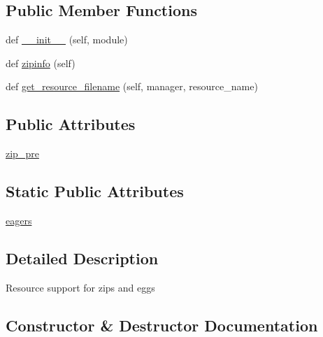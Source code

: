 \subsection*{Public Member Functions}
\begin{DoxyCompactItemize}
\item 
def \hyperlink{classpip_1_1__vendor_1_1pkg__resources_1_1ZipProvider_a6a6971955af1c89e8917f89b4f856101}{\+\_\+\+\_\+init\+\_\+\+\_\+} (self, module)
\item 
def \hyperlink{classpip_1_1__vendor_1_1pkg__resources_1_1ZipProvider_aa18eec9f792616d5ff701a41b3446585}{zipinfo} (self)
\item 
def \hyperlink{classpip_1_1__vendor_1_1pkg__resources_1_1ZipProvider_a86f81d4504722cafa68dad0f29058450}{get\+\_\+resource\+\_\+filename} (self, manager, resource\+\_\+name)
\end{DoxyCompactItemize}
\subsection*{Public Attributes}
\begin{DoxyCompactItemize}
\item 
\hyperlink{classpip_1_1__vendor_1_1pkg__resources_1_1ZipProvider_a8e41d56c67ec5435c776bc35af5d436b}{zip\+\_\+pre}
\end{DoxyCompactItemize}
\subsection*{Static Public Attributes}
\begin{DoxyCompactItemize}
\item 
\hyperlink{classpip_1_1__vendor_1_1pkg__resources_1_1ZipProvider_a64963e2866da1d9615a2c92277501970}{eagers}
\end{DoxyCompactItemize}


\subsection{Detailed Description}
\begin{DoxyVerb}Resource support for zips and eggs\end{DoxyVerb}
 

\subsection{Constructor \& Destructor Documentation}
\mbox{\label{classpip_1_1__vendor_1_1pkg__resources_1_1ZipProvider_a6a6971955af1c89e8917f89b4f856101}} 
